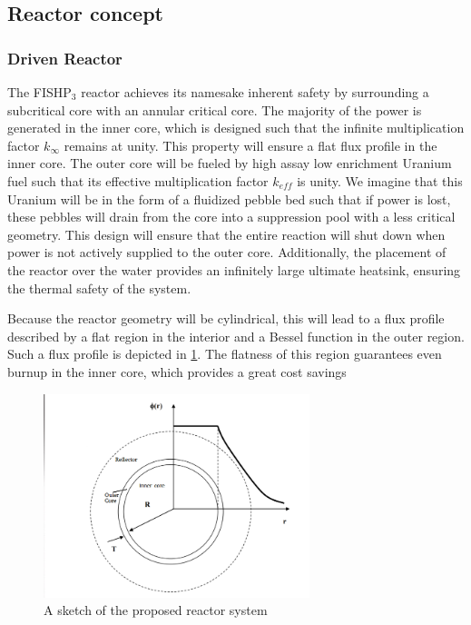 \documentclass[12pt]{article}
\begin{document}
\begin{itemize}
\end{itemize}

\subsection{Reactor concept}
\subsubsection{Driven Reactor}
The FISHP$_3$ reactor achieves its namesake inherent safety by surrounding a subcritical core with an annular critical core. The majority of the power is generated in the inner core, which is designed such that the infinite multiplication factor $k_\infty$ remains at unity. This property will ensure a flat flux profile in the inner core. The outer core will be fueled by high assay low enrichment Uranium fuel such that its effective multiplication factor $k_{eff}$ is unity. We imagine that this Uranium will be in the form of a fluidized pebble bed such that if power is lost, these pebbles will drain from the core into a suppression pool with a less critical geometry. This design will ensure that the entire reaction will shut down when power is not actively supplied to the outer core. Additionally, the placement of the reactor over the water provides an infinitely large ultimate heatsink, ensuring the thermal safety of the system.

Because the reactor geometry will be cylindrical, this will lead to a flux profile described by a flat region in the interior and a Bessel function in the outer region. Such a flux profile is depicted in \ref{f:standing-wave}. The flatness of this region guarantees even burnup in the inner core, which provides a great cost savings 

\begin{figure}[H]                                  
    \centering                                     
    \includegraphics[width=0.69\textwidth]{standing-wave}   
    \caption{A sketch of the proposed reactor system}                          
    \label{f:standing-wave}     
\end{figure}     
\end{document}
